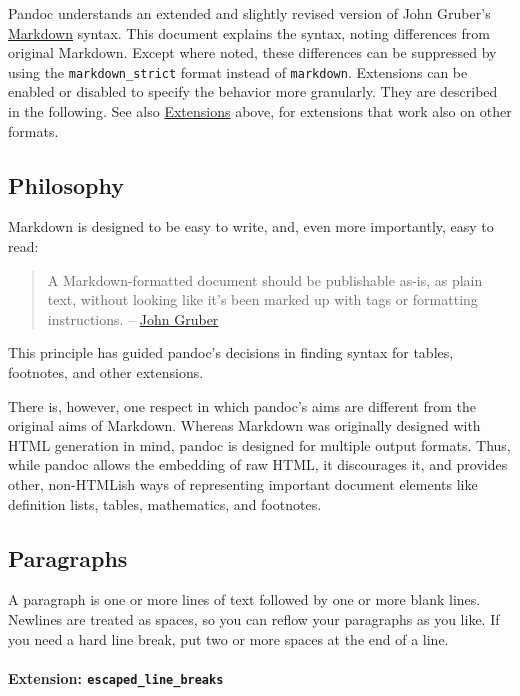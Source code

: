 \documentclass[
]{article}
\begin{document}
Pandoc understands an extended and slightly revised version of John
Gruber's \href{https://daringfireball.net/projects/markdown/}{Markdown}
syntax. This document explains the syntax, noting differences from
original Markdown. Except where noted, these differences can be
suppressed by using the \texttt{markdown\_strict} format instead of
\texttt{markdown}. Extensions can be enabled or disabled to specify the
behavior more granularly. They are described in the following. See also
\hyperref[extensions]{Extensions} above, for extensions that work also
on other formats.

\subsection{Philosophy}\label{philosophy}

Markdown is designed to be easy to write, and, even more importantly,
easy to read:

\begin{quote}
A Markdown-formatted document should be publishable as-is, as plain
text, without looking like it's been marked up with tags or formatting
instructions. --
\href{https://daringfireball.net/projects/markdown/syntax\#philosophy}{John
Gruber}
\end{quote}

This principle has guided pandoc's decisions in finding syntax for
tables, footnotes, and other extensions.

There is, however, one respect in which pandoc's aims are different from
the original aims of Markdown. Whereas Markdown was originally designed
with HTML generation in mind, pandoc is designed for multiple output
formats. Thus, while pandoc allows the embedding of raw HTML, it
discourages it, and provides other, non-HTMLish ways of representing
important document elements like definition lists, tables, mathematics,
and footnotes.

\subsection{Paragraphs}\label{paragraphs}

A paragraph is one or more lines of text followed by one or more blank
lines. Newlines are treated as spaces, so you can reflow your paragraphs
as you like. If you need a hard line break, put two or more spaces at
the end of a line.

\paragraph{\texorpdfstring{Extension:
\texttt{escaped\_line\_breaks}}{Extension: escaped\_line\_breaks}}\label{extension-escaped_line_breaks}
\end{document}
